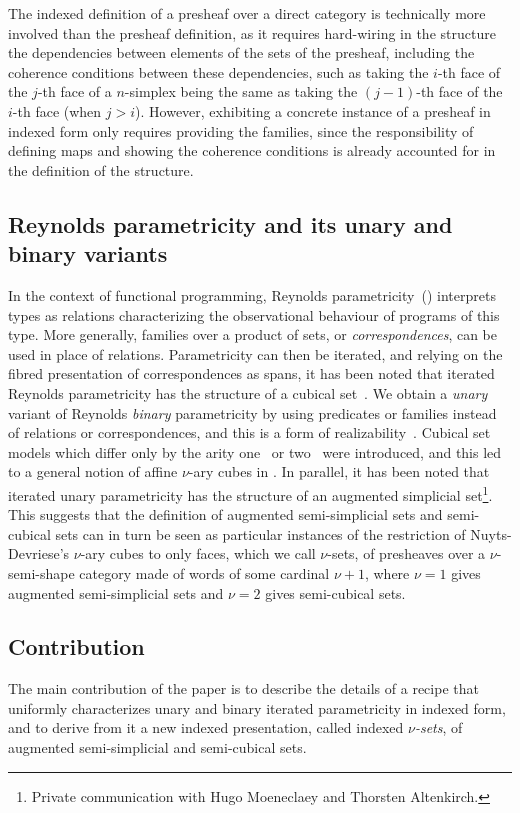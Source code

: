 \documentclass{msc}
\begin{document}
The indexed definition of a presheaf over a direct category is technically more involved than the presheaf definition, as it requires hard-wiring in the structure the dependencies between elements of the sets of the presheaf, including the coherence conditions between these dependencies, such as taking the $i$-th face of the $j$-th face of a $n$-simplex being the same as taking the $(j-1)$-th face of the $i$-th face (when $j>i$). However, exhibiting a concrete instance of a presheaf in indexed form only requires providing the families, since the responsibility of defining maps and showing the coherence conditions is already accounted for in the definition of the structure.

\subsection*{Reynolds parametricity and its unary and binary variants}
In the context of functional programming, Reynolds parametricity~(\citeyear{reynolds83}) interprets types as relations characterizing the observational behaviour of programs of this type. More generally, families over a product of sets, or \emph{correspondences}, can be used in place of relations. Parametricity can then be iterated, and relying on the fibred presentation of correspondences as spans, it has been noted that iterated Reynolds parametricity has the structure of a cubical set~\citep{altenkirch15,moulin16,johann17,moeneclaey21,moeneclaey22phd}. We obtain a \emph{unary} variant of Reynolds \emph{binary} parametricity by using predicates or families instead of relations or correspondences, and this is a form of realizability~\citep{bernardy12,lasson12,moulin16}. Cubical set models which differ only by the arity one~\citep{bernardy15} or two~\citep{bezem13} were introduced, and this led to a general notion of affine $\nu$-ary cubes in \cite{nuytsdevriese24}. In parallel, it has been noted that iterated unary parametricity has the structure of an augmented simplicial set\footnote{Private communication with Hugo Moeneclaey and Thorsten Altenkirch.}. This suggests that the definition of augmented semi-simplicial sets and semi-cubical sets can in turn be seen as particular instances of the restriction of Nuyts-Devriese's $\nu$-ary cubes to only faces, which we call $\nu$-sets, of presheaves over a $\nu$-semi-shape category made of words of some cardinal $\nu+1$, where $\nu=1$ gives augmented semi-simplicial sets and $\nu=2$ gives semi-cubical sets.

\subsection*{Contribution}
The main contribution of the paper is to describe the details of a recipe that uniformly characterizes unary and binary iterated parametricity in indexed form, and to derive from it a new indexed presentation, called indexed \emph{$\nu$-sets}, of augmented semi-simplicial and semi-cubical sets.
\end{document}
